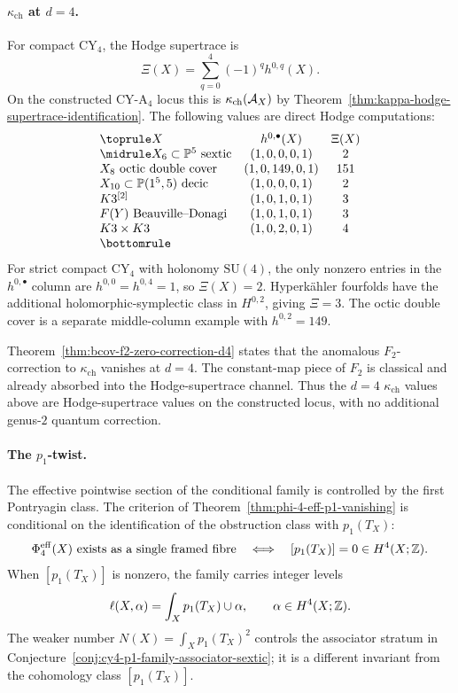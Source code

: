 \paragraph{\(\kappa_{\mathrm{ch}}\) at \(d=4\).}
For compact CY\(_4\), the Hodge supertrace is
\[
  \Xi(X)=\sum_{q=0}^4(-1)^q h^{0,q}(X).
\]
On the constructed CY-A\(_4\) locus this is
\(\kappa_{\mathrm{ch}}(\mathcal{A}_X)\) by
Theorem~\ref{thm:kappa-hodge-supertrace-identification}. The following
values are direct Hodge computations:
\[
\begin{array}{lcc}
\toprule
X & h^{0,\bullet}(X) & \Xi(X) \\
\midrule
X_6\subset\bP^5\ \text{sextic} & (1,0,0,0,1) & 2\\
X_8\ \text{octic double cover} & (1,0,149,0,1) & 151\\
X_{10}\subset\bP(1^5,5)\ \text{decic} & (1,0,0,0,1) & 2\\
K3^{[2]} & (1,0,1,0,1) & 3\\
F(Y)\ \text{Beauville--Donagi} & (1,0,1,0,1) & 3\\
K3\times K3 & (1,0,2,0,1) & 4\\
\bottomrule
\end{array}
\]
For strict compact CY\(_4\) with holonomy \(\mathrm{SU}(4)\), the only
nonzero entries in the \(h^{0,\bullet}\) column are \(h^{0,0}=h^{0,4}=1\),
so \(\Xi(X)=2\). Hyperk\"ahler fourfolds have the additional
holomorphic-symplectic class in \(H^{0,2}\), giving \(\Xi=3\). The octic
double cover is a separate middle-column example with \(h^{0,2}=149\).

\begin{remark}
\label{rem:cy4-f2-scope-clean}
Theorem~\ref{thm:bcov-f2-zero-correction-d4} states that the anomalous
\(F_2\)-correction to \(\kappa_{\mathrm{ch}}\) vanishes at \(d=4\). The
constant-map piece of \(F_2\) is classical and already absorbed into the
Hodge-supertrace channel. Thus the \(d=4\) \(\kappa_{\mathrm{ch}}\) values
above are Hodge-supertrace values on the constructed locus, with no
additional genus-\(2\) quantum correction.
\end{remark}

\paragraph{The \(p_1\)-twist.}
The effective pointwise section of the conditional family is controlled by
the first Pontryagin class. The criterion of
Theorem~\ref{thm:phi-4-eff-p1-vanishing} is conditional on the
identification of the obstruction class with \(p_1(T_X)\):
\[
  \Phi_4^{\mathrm{eff}}(X)\ \text{exists as a single framed fibre}
  \quad\Longleftrightarrow\quad
  [p_1(T_X)]=0\in H^4(X;\mathbb{Z}).
\]
When \([p_1(T_X)]\) is nonzero, the family carries integer levels
\[
  \ell(X,\alpha)=\int_X p_1(T_X)\cup\alpha,\qquad \alpha\in H^4(X;\mathbb{Z}).
\]
The weaker number \(N(X)=\int_Xp_1(T_X)^2\) controls the associator
stratum in Conjecture~\ref{conj:cy4-p1-family-associator-sextic}; it is a
different invariant from the cohomology class \([p_1(T_X)]\).

